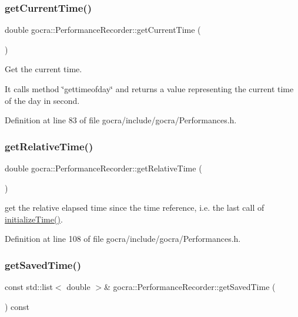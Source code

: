 \subsubsection{\texorpdfstring{get\+Current\+Time()}{getCurrentTime()}}
{\footnotesize\ttfamily double gocra\+::\+Performance\+Recorder\+::get\+Current\+Time (\begin{DoxyParamCaption}{ }\end{DoxyParamCaption})\hspace{0.3cm}{\ttfamily [inline]}}

Get the current time.

It calls method \char`\"{}gettimeofday\char`\"{} and returns a value representing the current time of the day in second. 

Definition at line 83 of file gocra/include/gocra/\+Performances.\+h.

\hypertarget{classgocra_1_1PerformanceRecorder_aed74024b507ec92e6ef6a3821f70f047}{}\label{classgocra_1_1PerformanceRecorder_aed74024b507ec92e6ef6a3821f70f047} 
\subsubsection{\texorpdfstring{get\+Relative\+Time()}{getRelativeTime()}}
{\footnotesize\ttfamily double gocra\+::\+Performance\+Recorder\+::get\+Relative\+Time (\begin{DoxyParamCaption}{ }\end{DoxyParamCaption})\hspace{0.3cm}{\ttfamily [inline]}}

get the relative elapsed time since the time reference, i.\+e. the last call of \hyperlink{classgocra_1_1PerformanceRecorder_ac0a5ac7aa54b9abc0a4c25cd291dbee9}{initialize\+Time()}. 

Definition at line 108 of file gocra/include/gocra/\+Performances.\+h.

\hypertarget{classgocra_1_1PerformanceRecorder_a455aa6ce738511632d968b16632f8994}{}\label{classgocra_1_1PerformanceRecorder_a455aa6ce738511632d968b16632f8994} 
\subsubsection{\texorpdfstring{get\+Saved\+Time()}{getSavedTime()}}
{\footnotesize\ttfamily const std\+::list$<$ double $>$\& gocra\+::\+Performance\+Recorder\+::get\+Saved\+Time (\begin{DoxyParamCaption}{ }\end{DoxyParamCaption}) const\hspace{0.3cm}{\ttfamily [inline]}}

